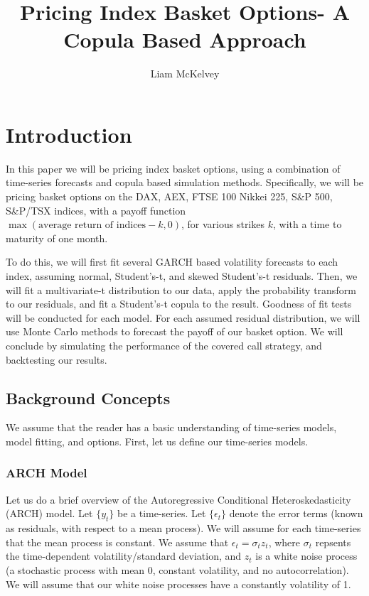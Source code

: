 \documentclass[11pt]{article}
\title{Pricing Index Basket Options- A Copula Based Approach}
\author{Liam McKelvey}
\begin{document}
    
    \maketitle
    
    

    
    \section{Introduction}\label{introduction}

In this paper we will be pricing index basket options, using a
combination of time-series forecasts and copula based simulation
methods. Specifically, we will be pricing basket options on the DAX,
AEX, FTSE 100 Nikkei 225, S\&P 500, S\&P/TSX indices, with a payoff
function \(\max{(\text{average return of indices}-k, 0)}\), for various
strikes \(k\), with a time to maturity of one month.

To do this, we will first fit several GARCH based volatility forecasts
to each index, assuming normal, Student's-t, and skewed Student's-t
residuals. Then, we will fit a multivariate-t distribution to our data,
apply the probability transform to our residuals, and fit a Student's-t
copula to the result. Goodness of fit tests will be conducted for each
model. For each assumed residual distribution, we will use Monte Carlo
methods to forecast the payoff of our basket option. We will conclude by
simulating the performance of the covered call strategy, and backtesting
our results.

    \subsection{Background Concepts}\label{background-concepts}

    We assume that the reader has a basic understanding of time-series
models, model fitting, and options. First, let us define our time-series
models.

\subsubsection{ARCH Model}\label{arch-model}

Let us do a brief overview of the Autoregressive Conditional
Heteroskedasticity (ARCH) model. Let \(\{y_t\}\) be a time-series. Let
\(\{\epsilon_t\}\) denote the error terms (known as residuals, with
respect to a mean process). We will assume for each time-series that the
mean process is constant. We assume that \(\epsilon _t = \sigma_t z_t\),
where \(\sigma_t\) repsents the time-dependent volatility/standard
deviation, and \(z_t\) is a white noise process (a stochastic process
with mean 0, constant volatility, and no autocorrelation). We will
assume that our white noise processes have a constantly volatility of 1.
\end{document}
